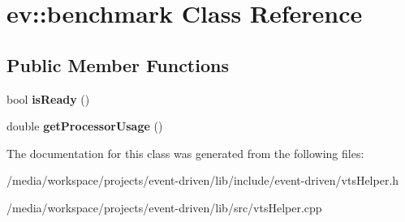 \hypertarget{classev_1_1benchmark}{}\section{ev\+:\+:benchmark Class Reference}
\label{classev_1_1benchmark}
\subsection*{Public Member Functions}
\begin{DoxyCompactItemize}
\item 
\mbox{\label{classev_1_1benchmark_a10722bcfcf5df8e34fc2f17e0247290f}} 
bool {\bfseries is\+Ready} ()
\item 
\mbox{\label{classev_1_1benchmark_a23509b8f8895bafdb36e8bccfc14f82b}} 
double {\bfseries get\+Processor\+Usage} ()
\end{DoxyCompactItemize}


The documentation for this class was generated from the following files\+:\begin{DoxyCompactItemize}
\item 
/media/workspace/projects/event-\/driven/lib/include/event-\/driven/vts\+Helper.\+h\item 
/media/workspace/projects/event-\/driven/lib/src/vts\+Helper.\+cpp\end{DoxyCompactItemize}
